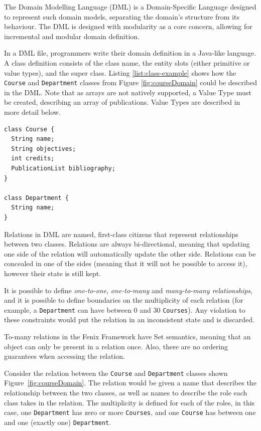 \documentclass{llncs}
\begin{document}
The Domain Modelling Language (DML) is a Domain-Specific Language
designed to represent such domain models, separating the domain's
structure from its behaviour. The DML is designed with modularity as a
core concern, allowing for incremental and modular domain definition.

In a DML file, programmers write their domain definition in a
Java-like language. A class definition consists of the class name, the
entity slots (either primitive or value types), and the super
class. Listing \ref{list:class-example} shows how the \texttt{Course}
and \texttt{Department} classes from Figure \ref{fig:courseDomain}
could be described in the DML. Note that as arrays are not natively
supported, a Value Type must be created, describing an array of
publications. Value Types are described in more detail below.

\begin{lstlisting}[caption={DML for the \texttt{Course} and 
  \texttt{Department} classes},
  label={list:class-example}, float]
class Course {
  String name;
  String objectives;
  int credits;
  PublicationList bibliography;
}

class Department {
  String name;
}
\end{lstlisting}

Relations in DML are named, first-class citizens that represent
relationships between two classes. Relations are always bi-directional,
meaning that updating one side of the relation will automatically
update the other side. Relations can be concealed in one of the sides
(meaning that it will not be possible to access it), however their
state is still kept.

It is possible to define {\it one-to-one}, {\it one-to-many} and {\it
  many-to-many relationships}, and it is possible to define boundaries
on the multiplicity of each relation (for example, a
\texttt{Department} can have between 0 and 30 \texttt{Courses}). Any
violation to these constraints would put the relation in an
inconsistent state and is discarded.

To-many relations in the Fenix Framework have Set semantics, meaning
that an object can only be present in a relation once. Also, there are
no ordering guarantees when accessing the relation.

Consider the relation between the \texttt{Course} and
\texttt{Department} classes shown Figure~\ref{fig:courseDomain}. The
relation would be given a name that describes the relationship between
the two classes, as well as names to describe the role each class
takes in the relation. The multiplicity is defined for each of the
roles, in this case, one \texttt{Department} has zero or more
\texttt{Courses}, and one \texttt{Course} has between one and one
(exactly one) \texttt{Department}.
\end{document}
